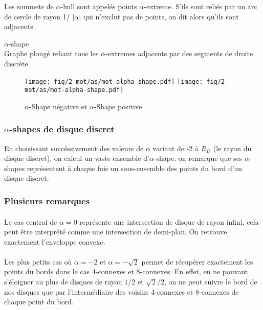 Les sommets de $\alpha$-hull sont appelés points $\alpha$-extreme. S'ils sont reliés par un arc de cercle de rayon 1/ $\lvert \alpha \rvert$ qui n'exclut pas de points, on dit alors qu'ils sont adjacents.

\begin{Definition}{$\alpha$-shape}\\
\label{def:as}
      Graphe plongé reliant tous les $\alpha$-extremes adjacents par des segments de droite discrète.
\end{Definition}

\begin{figure}[h!]
  \centering
  \texttt{[image: fig/2-mot/as/mot-alpha-shape.pdf]}
  \texttt{[image: fig/2-mot/as/mot-alpha-shape.pdf]}
  \caption{$\alpha$-Shape négative et $\alpha$-Shape positive }
\end{figure}


\subsubsection{$\alpha$-shapes de disque discret}

En choisissant succéssivement des valeurs de $\alpha$ variant de -2 à $R_D$ (le rayon du disque discret), on calcul un vaste ensemble d'$\alpha$-shape. on remarque que ses $\alpha$-shapes représentent à chaque fois un sous-ensemble des points du bord d'un disque discret.


\subsubsection{Plusieurs remarques}

\paragraph{}
Le cas central de $\alpha = 0$ représente une intersection de disque de rayon infini, cela peut être interprété comme une intersection de demi-plan. On retrouve exactement l'enveloppe convexe.

\paragraph{}
Les plus petits cas où $\alpha = -2$ et $\alpha = -\sqrt{2}$ permet de récupérer exactement les points du bords dans le cas 4-connexes et 8-connexes. En effet, en ne pouvant s'éloigner au plus de disques de rayon $1/2$ et $\sqrt{2}/2$, on ne peut suivre le bord de nos disques que par l'intermédiaire des voisins 4-connexes et 8-connexes de chaque point du bord.

